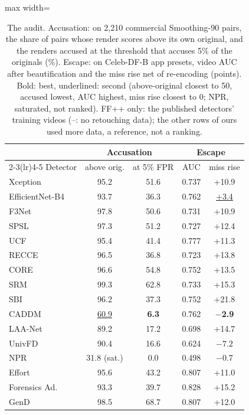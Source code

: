 \documentclass[conference,a4paper]{IEEEtran}
\begin{document}
\begin{table}[!htb]
\centering
\caption{The audit. Accusation: on 2,210 commercial Smoothing-90 pairs, the share of pairs whose render scores above its own
original, and the renders accused at the threshold that accuses 5\% of the originals (\%). Escape: on Celeb-DF-B app presets,
video AUC after beautification and the miss rise net of re-encoding (points). Bold: best, underlined: second (above-original
closest to 50, accused lowest, AUC highest, miss rise closest to 0; NPR, saturated, not ranked). FF++ only: the published
detectors' training videos (--: no retouching data); the other rows of ours used more data, a reference, not a ranking.}
\label{tab:audit}
\footnotesize
\renewcommand{\arraystretch}{0.92}
\begin{adjustbox}{max width=\columnwidth}
\begin{tabular}{@{}lcccc@{}}
\toprule
 & \multicolumn{2}{c}{Accusation} & \multicolumn{2}{c}{Escape} \\
\cmidrule(lr){2-3}\cmidrule(lr){4-5}
Detector & above orig. & at 5\% FPR & AUC & miss rise \\
\midrule
Xception & 95.2 & 51.6 & 0.737 & +10.9 \\
EfficientNet-B4 & 93.7 & 36.3 & 0.762 & \underline{+3.4} \\
F3Net & 97.8 & 50.6 & 0.731 & +10.9 \\
SPSL & 97.3 & 51.2 & 0.727 & +12.4 \\
UCF & 95.4 & 41.4 & 0.777 & +11.3 \\
RECCE & 96.5 & 36.8 & 0.723 & +13.8 \\
CORE & 96.6 & 54.8 & 0.752 & +13.5 \\
SRM & 99.3 & 62.8 & 0.733 & +15.3 \\
SBI~\cite{sbi} & 96.2 & 37.3 & 0.752 & +21.8 \\
CADDM~\cite{caddm} & \underline{60.9} & \textbf{6.3} & 0.762 & \textbf{$-$2.9} \\
LAA-Net~\cite{laanet} & 89.2 & 17.2 & 0.698 & +14.7 \\
UnivFD~\cite{univfd} & 90.4 & 16.6 & 0.624 & $-7.2$ \\
NPR~\cite{npr} & 31.8 (sat.) & 0.0 & 0.498 & $-0.7$ \\
Effort~\cite{effort} & 95.6 & 43.2 & 0.807 & +11.0 \\
Forensics Ad.~\cite{forensicsadapter} & 93.3 & 39.7 & 0.828 & +15.2 \\
GenD~\cite{gend2026} & 98.5 & 68.7 & 0.807 & +12.0 \\

\end{tabular}
\end{adjustbox}
\end{table}
\end{document}
